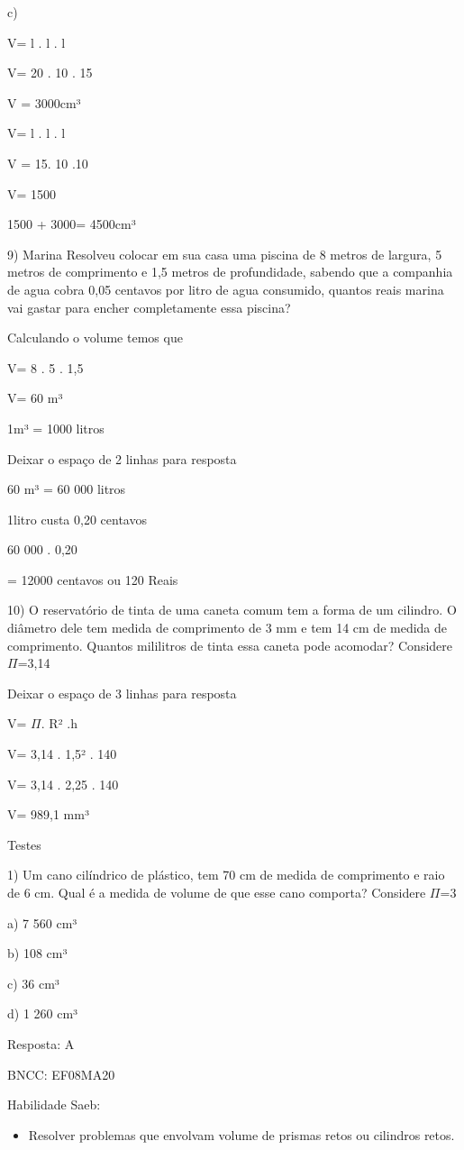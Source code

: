 {c)

V= l . l . l

V= 20 . 10 . 15

V = 3000cm³

V= l . l . l

V = 15. 10 .10

V= 1500

1500 + 3000= 4500cm³

9) Marina Resolveu colocar em sua casa uma piscina de 8 metros de
largura, 5 metros de comprimento e 1,5 metros de profundidade, sabendo
que a companhia de agua cobra 0,05 centavos por litro de agua consumido,
quantos reais marina vai gastar para encher completamente essa piscina?

Calculando o volume temos que

V= 8 . 5 . 1,5

V= 60 m³

1m³ = 1000 litros

Deixar o espaço de 2 linhas para resposta

60 m³ = 60 000 litros

1litro custa 0,20 centavos

60 000 . 0,20

= 12000 centavos ou 120 Reais

10) O reservatório de tinta de uma caneta comum tem a forma de um
cilindro. O diâmetro dele tem medida de comprimento de 3 mm e tem 14 cm
de medida de comprimento. Quantos mililitros de tinta essa caneta pode
acomodar? Considere \(\Pi\)=3,14

Deixar o espaço de 3 linhas para resposta

V= \(\Pi\). R² .h

V= 3,14 . 1,5² . 140

V= 3,14 . 2,25 . 140

V= 989,1 mm³

Testes

1) Um cano cilíndrico de plástico, tem 70 cm de medida de comprimento e
raio de 6 cm. Qual é a medida de volume de que esse cano comporta?
Considere \(\Pi\)=3

a) 7 560 cm³

b) 108 cm³

c) 36 cm³

d) 1 260 cm³

Resposta: A

BNCC: EF08MA20

Habilidade Saeb:

\begin{itemize}
\tightlist
\item
  Resolver problemas que envolvam volume de prismas retos ou cilindros
  retos.
\end{itemize}

}

